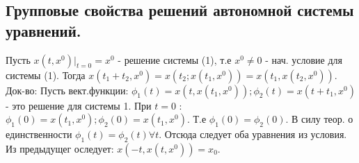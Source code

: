 \documentclass[unicode, 12pt, a4paper,oneside, landscape]{article}
\begin{document}
\begin{multicols}{4}

\subsection{Групповые свойства решений автономной системы уравнений.}
Пусть $x(t, x^0)|_{t=0} = x^0$ - решение системы (1), т.е $x^0 \neq 0$ - нач. условие для системы (1). Тогда $x(t_1 + t_2, x^0) = x(t_2; x(t_1, x^0)) = x(t_1, x(t_2, x^0)).$ Док-во: Пусть вект.функции: $\phi_1(t) = x(t, x(t_1, x^0)); \phi_2(t) = x(t + t_1, x^0)$ - это решение для системы 1. При $t = 0$ : $\phi_1(0) = x(t_1, x^0); \phi_2(0) = x(t_1, x^0)$. Т.е $\phi_1(0) = \phi_2(0)$. В силу теор. о единственности $\phi_1(t) = \phi_2(t) \forall t$. Отсюда следует оба уравнения из условия. Из предыдущег оследует: $x(-t, x(t, x^0)) = x_0$.


\end{multicols}	
\end{document}
